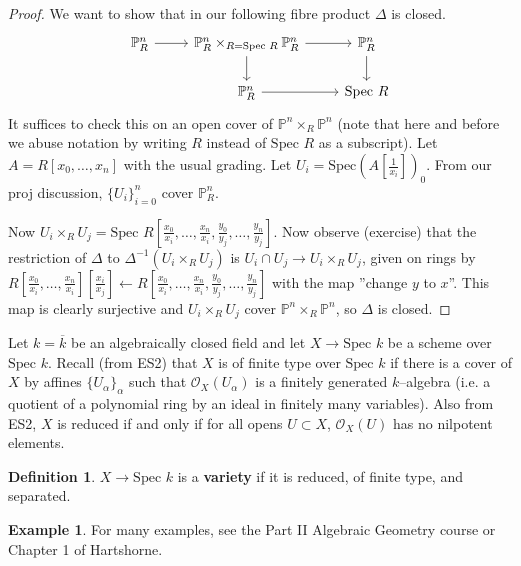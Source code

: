 \documentclass{article}
\theoremstyle{definition}
\newtheorem{example}{Example}[section]
\newtheorem{defn}{Definition}[section]
\begin{document}
\begin{proof}
    We want to show that in our following fibre product $\Delta$ is closed.
    $$\begin{tikzcd}[]
        \mathbb{P}_R^n & \mathbb{P}_R^n \times_{R = \text{Spec }R} \mathbb{P}_R^n & \mathbb{P}_R^n\\
        & \mathbb{P}_R^n & \text{Spec }R
        \arrow["", from=1-1, to=1-2]
        \arrow["", from=1-2, to=1-3]
        \arrow["", from=1-2, to=2-2]
        \arrow["", from=2-2, to=2-3]
        \arrow["", from=1-3, to=2-3]
    \end{tikzcd}$$ 
    It suffices to check this on an open cover of $\mathbb{P}^n \times_R \mathbb{P}^n$ (note that here and before we abuse notation by writing $R$ instead of $\text{Spec }R$ as a subscript). Let $A = R[x_0,\ldots,x_n]$ with the usual grading. Let $U_i = \text{Spec} \left(A[\frac{1}{x_i}]\right)_0$. From our proj discussion, $\{U_i\}_{i=0}^n$ cover $\mathbb{P}_R^n$.
    \vspace{1mm}
     
    Now $U_i \times_R U_j = \text{Spec }R\left[\frac{x_0}{x_i},\ldots,\frac{x_n}{x_i},\frac{y_0}{y_j},\ldots, \frac{y_n}{y_j}\right]$. Now observe (exercise) that the restriction of $\Delta$ to $\Delta^{-1}(U_i \times_R U_j)$ is $U_i \cap U_j \to U_i \times_R U_j$, given on rings by $R\left[\frac{x_0}{x_i},\ldots,\frac{x_n}{x_i}\right]\left[\frac{x_i}{x_j}\right] \leftarrow R\left[\frac{x_0}{x_i},\ldots,\frac{x_n}{x_i},\frac{y_0}{y_j},\ldots, \frac{y_n}{y_j}\right]$ with the map ''change $y$ to $x$''. This map is clearly surjective and $U_i \times_R U_j$ cover $\mathbb{P}^n \times_R \mathbb{P}^n$, so $\Delta$ is closed.
\end{proof}

Let $k = \overline{k}$ be an algebraically closed field and let $X \to \text{Spec }k$ be a scheme over $\text{Spec }k$. Recall (from ES2) that $X$ is of finite type over $\text{Spec }k$ if there is a cover of $X$ by affines $\{U_\alpha\}_{\alpha}$ such that $\mathcal{O}_{X}(U_{\alpha})$ is a finitely generated $k$--algebra (i.e. a quotient of a polynomial ring by an ideal in finitely many variables). Also from ES2, $X$ is reduced if and only if for all opens $U \subset X$, $\mathcal{O}_{X}(U)$ has no nilpotent elements.

\begin{defn}
    $X \to \text{Spec }k$ is a \textbf{variety} if it is reduced, of finite type, and separated.
\end{defn}
\begin{example}
    For many examples, see the Part II Algebraic Geometry course or Chapter 1 of Hartshorne.
\end{example}
\end{document}
